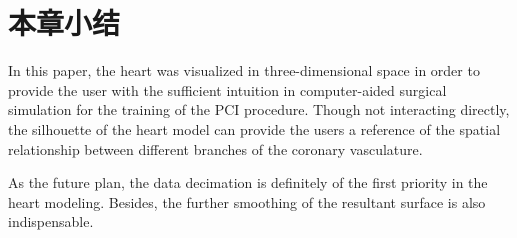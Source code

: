 \section{本章小结}
\label{sec7-5} 

In this paper, the heart was visualized in three-dimensional space in order to provide the user with the sufficient intuition in computer-aided surgical simulation for the training of the PCI procedure. %
Though not interacting directly, the silhouette of the heart model can provide the users a reference of the spatial relationship between different branches of the coronary vasculature. %

As the future plan, the data decimation is definitely of the first priority in the heart modeling.
Besides, the further smoothing of the resultant surface is also indispensable.